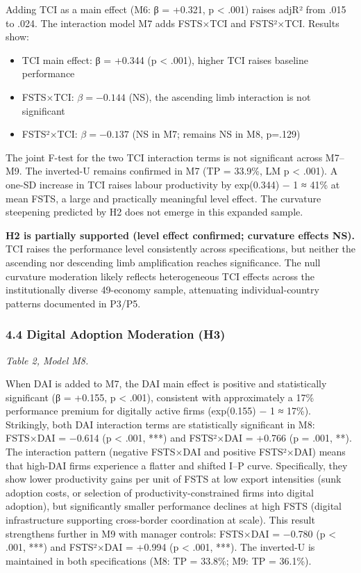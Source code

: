 \documentclass[12pt,a4paper]{article}
\providecommand{\tightlist}{\setlength{\itemsep}{0pt}\setlength{\parskip}{0pt}}
\begin{document}
Adding TCI as a main effect (M6: β = +0.321, p \textless{} .001) raises
adjR² from .015 to .024. The interaction model M7 adds FSTS×TCI and
FSTS²×TCI. Results show:

\begin{itemize}
\tightlist
\item
  TCI main effect: β = +0.344 (p \textless{} .001), higher TCI raises
  baseline performance
\item
  FSTS×TCI: \(\beta = −0.144\) (NS), the ascending limb interaction is
  not significant
\item
  FSTS²×TCI: \(\beta = −0.137\) (NS in M7; remains NS in M8, p=.129)
\end{itemize}

The joint F-test for the two TCI interaction terms is not significant
across M7--M9. The inverted-U remains confirmed in M7 (TP = 33.9\%, LM p
\textless{} .001). A one-SD increase in TCI raises labour productivity
by exp(0.344) − 1 ≈ 41\% at mean FSTS, a large and practically
meaningful level effect. The curvature steepening predicted by H2 does
not emerge in this expanded sample.

\textbf{H2 is partially supported (level effect confirmed; curvature
effects NS).} TCI raises the performance level consistently across
specifications, but neither the ascending nor descending limb
amplification reaches significance. The null curvature moderation likely
reflects heterogeneous TCI effects across the institutionally diverse
49-economy sample, attenuating individual-country patterns documented in
P3/P5.

\hypertarget{44-digital-adoption-moderation-h3}{%
\subsubsection{4.4 Digital Adoption Moderation
(H3)}\label{44-digital-adoption-moderation-h3}}

\emph{Table 2, Model M8.}

When DAI is added to M7, the DAI main effect is positive and
statistically significant (β = +0.155, p \textless{} .001), consistent
with approximately a 17\% performance premium for digitally active firms
(exp(0.155) − 1 ≈ 17\%). Strikingly, both DAI interaction terms are
statistically significant in M8: FSTS×DAI = −0.614 (p \textless{} .001,
***) and FSTS²×DAI = +0.766 (p = .001, **). The interaction pattern
(negative FSTS×DAI and positive FSTS²×DAI) means that high-DAI firms
experience a flatter and shifted I--P curve. Specifically, they show
lower productivity gains per unit of FSTS at low export intensities
(sunk adoption costs, or selection of productivity-constrained firms
into digital adoption), but significantly smaller performance declines
at high FSTS (digital infrastructure supporting cross-border
coordination at scale). This result strengthens further in M9 with
manager controls: FSTS×DAI = −0.780 (p \textless{} .001, ***) and
FSTS²×DAI = +0.994 (p \textless{} .001, ***). The inverted-U is
maintained in both specifications (M8: TP = 33.8\%; M9: TP = 36.1\%).
\end{document}
